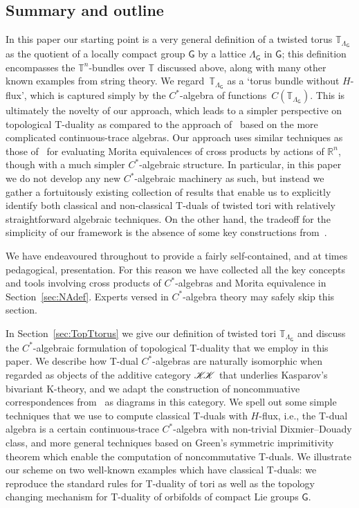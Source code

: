 \documentclass[pdftex]{sigma}
\numberwithin{equation}{section}
\newcommand{\CCK}{\mathscr{K}}
\newcommand{\sfG}{\mathsf{G}}
\newcommand{\R}{\real}
\newcommand{\real}{{\mathbb R}} %
\newcommand{\torus}{{\mathbb T}} %
\begin{document}
\subsection{Summary and outline}

In this paper our starting point is a very general definition of a
twisted torus $\torus_{\Lambda_\sfG}$ as the quotient of a locally
compact group $\sfG$ by a lattice $\Lambda_\sfG$ in $\sfG$; this definition
encompasses the $\torus^n$-bundles over $\torus$ discussed above,
along with many other known examples from string theory. We regard~$\torus_{\Lambda_\sfG}$ as a `torus bundle without $H$-flux', which is
captured simply by the $C^*$-algebra of functions~$C(\torus_{\Lambda_\sfG})$. This is ultimately the novelty of our
approach, which leads to a simpler perspective on topological
T-duality as compared to the approach of~\cite{Mathai2004,Mathai2005}
based on the more complicated continuous-trace algebras. Our approach
uses similar techniques as those of~\cite{Mathai2004,Mathai2005} for
evaluating Morita equivalences of cross products by actions of $\R^n$,
though with a much simpler $C^*$-algebraic structure. In particular,
in this paper we do not develop any new $C^*$-algebraic machinery as such, but instead
we gather a fortuitously existing collection of results that enable us
to explicitly identify both classical and non-classical T-duals of
twisted tori with relatively straightforward algebraic techniques. On
the other hand, the tradeoff for the simplicity of our framework is
the absence of some key constructions
from~\cite{Bouwknegt2008, Mathai2004,Mathai2005}.

We have endeavoured throughout to provide a fairly self-contained, and at times
pedagogical, presentation. For this reason we have collected all the
key concepts and tools involving cross products of $C^*$-algebras and
Morita equivalence in Section~\ref{sec:NAdef}. Experts versed in
$C^*$-algebra theory may safely skip this section.

In Section~\ref{sec:TopTtorus} we give our definition of twisted tori
$\torus_{\Lambda_\sfG}$ and discuss the $C^*$-algebraic formulation of topological
T-duality that we employ in this paper. We describe how T-dual
$C^*$-algebras are naturally isomorphic when regarded as objects of
the additive category $\CCK\hspace{-1mm}\CCK$ that underlies
Kasparov's bivariant K-theory, and we adapt the construction of
noncommuative correspondences from~\cite{Brodzki2007} as diagrams in
this category. We spell out some simple techniques that we use to
compute classical T-duals with $H$-flux, i.e., the T-dual algebra is a
certain continuous-trace $C^*$-algebra with non-trivial
Dixmier--Douady class, and more general techniques based on Green's
symmetric imprimitivity
theorem which enable the computation of noncommutative T-duals. We
illustrate our scheme on two well-known examples which have classical
T-duals: we reproduce the standard rules for T-duality of tori as well
as the topology changing mechanism for T-duality of orbifolds of
compact Lie groups $\sfG$.
\end{document}
